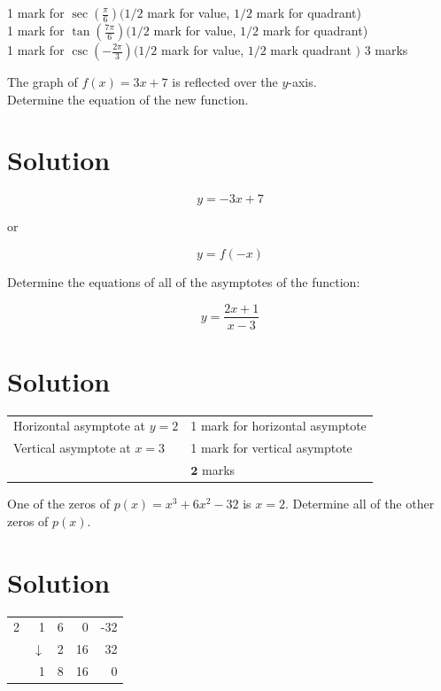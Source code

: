 \documentclass[10pt]{article}
\begin{document}
1 mark for $\sec \left(\frac{\pi}{6}\right)(1 / 2$ mark for value, $1 / 2$ mark for quadrant)\\
1 mark for $\tan \left(\frac{7 \pi}{6}\right)(1 / 2$ mark for value, $1 / 2$ mark for quadrant)\\
1 mark for $\csc \left(-\frac{2 \pi}{3}\right)(1 / 2$ mark for value, $1 / 2$ mark quadrant $)$ 3 marks

The graph of $f(x)=3 x+7$ is reflected over the $y$-axis.\\
Determine the equation of the new function.

\section*{Solution}
$$
y=-3 x+7
$$

or

$$
y=f(-x)
$$

Determine the equations of all of the asymptotes of the function:

$$
y=\frac{2 x+1}{x-3}
$$

\section*{Solution}
\begin{center}
\begin{tabular}{ll}
Horizontal asymptote at $y=2$ & 1 mark for horizontal asymptote \\
Vertical asymptote at $x=3$ & 1 mark for vertical asymptote \\
 & $\mathbf{2}$ marks \\
\end{tabular}
\end{center}

One of the zeros of $p(x)=x^{3}+6 x^{2}-32$ is $x=2$. Determine all of the other zeros of $p(x)$.

\section*{Solution}
\begin{center}
\begin{tabular}{r|rrrr}
2 & 1 & 6 & 0 & -32 \\
 & $\downarrow$ & 2 & 16 & 32 \\
\hline
 & 1 & 8 & 16 & 0 \\
\hline
\end{tabular}
\end{center}
\end{document}
